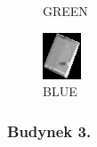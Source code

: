 \documentclass[a4paper,12pt]{article}  %
\begin{document}
\begin{figure}[H]
\begin{minipage}{0.24\textwidth}
        \caption*{GREEN}
    \end{minipage}
    \begin{minipage}{0.24\textwidth}
        \centering
        \includegraphics[width=\linewidth]{spektralne/blue_budynek0.png}
        \caption*{BLUE}
    \end{minipage}
\end{figure}

\subsubsection{Budynek 3.}
\end{document}
